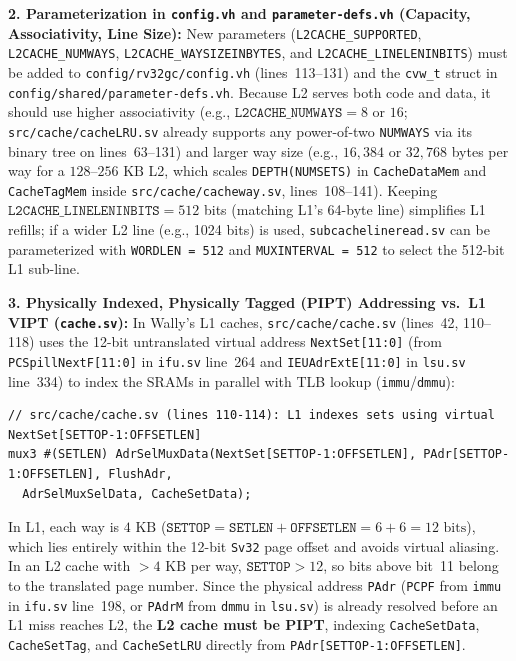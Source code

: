 \documentclass[11pt,a4paper]{article}
\begin{document}
\textbf{2. Parameterization in \texttt{config.vh} and \texttt{parameter-defs.vh} (Capacity, Associativity, Line Size):}
New parameters (\texttt{L2CACHE\_SUPPORTED}, \texttt{L2CACHE\_NUMWAYS}, \texttt{L2CACHE\_WAYSIZEINBYTES}, and \texttt{L2CACHE\_\allowbreak LINELENINBITS}) must be added to \texttt{config/rv32gc/config.vh} (lines~113--131) and the \texttt{cvw\_t} struct in \texttt{config/\allowbreak shared/\allowbreak parameter-defs.vh}. Because L2 serves both code and data, it should use higher associativity (e.g., $\texttt{L2CACHE\_NUMWAYS} = 8$ or $16$; \texttt{src/\allowbreak cache/\allowbreak cacheLRU.sv} already supports any power-of-two \texttt{NUMWAYS} via its binary tree on lines~63--131) and larger way size (e.g., $16{,}384$ or $32{,}768$ bytes per way for a $128\text{--}256\text{ KB}$ L2, which scales \texttt{DEPTH(NUMSETS)} in \texttt{CacheDataMem} and \texttt{CacheTagMem} inside \texttt{src/\allowbreak cache/\allowbreak cacheway.sv}, lines~108--141). Keeping $\texttt{L2CACHE\_LINELENINBITS} = 512$ bits (matching L1's 64-byte line) simplifies L1 refills; if a wider L2 line (e.g., 1024 bits) is used, \texttt{subcachelineread.sv} can be parameterized with \texttt{WORDLEN = 512} and \texttt{MUXINTERVAL = 512} to select the 512-bit L1 sub-line.

\textbf{3. Physically Indexed, Physically Tagged (PIPT) Addressing vs.\ L1 VIPT (\texttt{cache.sv}):}
In Wally's L1 caches, \texttt{src/cache/cache.sv} (lines~42, 110--118) uses the 12-bit untranslated virtual address \texttt{NextSet[11:0]} (from \texttt{PCSpillNextF[11:0]} in \texttt{ifu.sv} line~264 and \texttt{IEUAdrExtE[11:0]} in \texttt{lsu.sv} line~334) to index the SRAMs in parallel with TLB lookup (\texttt{immu}/\texttt{dmmu}):
\begin{lstlisting}[style=verilogstyle]
// src/cache/cache.sv (lines 110-114): L1 indexes sets using virtual NextSet[SETTOP-1:OFFSETLEN]
mux3 #(SETLEN) AdrSelMuxData(NextSet[SETTOP-1:OFFSETLEN], PAdr[SETTOP-1:OFFSETLEN], FlushAdr,
  AdrSelMuxSelData, CacheSetData);
\end{lstlisting}
In L1, each way is $4\text{ KB}$ ($\texttt{SETTOP} = \texttt{SETLEN} + \texttt{OFFSETLEN} = 6 + 6 = 12\text{ bits}$), which lies entirely within the 12-bit \texttt{Sv32} page offset and avoids virtual aliasing. In an L2 cache with $>4\text{ KB}$ per way, $\texttt{SETTOP} > 12$, so bits above bit~11 belong to the translated page number. Since the physical address \texttt{PAdr} (\texttt{PCPF} from \texttt{immu} in \texttt{ifu.sv} line~198, or \texttt{PAdrM} from \texttt{dmmu} in \texttt{lsu.sv}) is already resolved before an L1 miss reaches L2, the \textbf{L2 cache must be PIPT}, indexing \texttt{CacheSetData}, \texttt{CacheSetTag}, and \texttt{CacheSetLRU} directly from \texttt{PAdr[SETTOP-1:OFFSETLEN]}.
\end{document}
